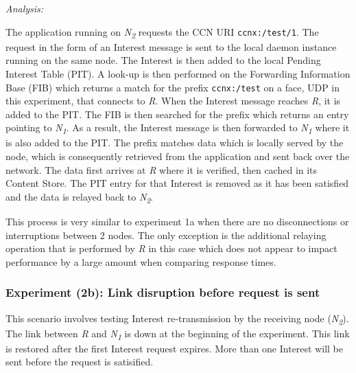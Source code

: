 \documentclass[a4paper,12pt]{report}      %
\begin{document}
\vspace*{1\baselineskip}\noindent\emph{Analysis:}

The application running on  \emph{N\textsubscript{2}} requests the CCN URI \verb!ccnx:/test/1!. The request in the form
of an Interest message is sent to the local daemon instance running on the same node. The Interest is
then added to the local Pending Interest Table (PIT). A look-up is then performed on the Forwarding
Information Base (FIB) which returns a match for the prefix \verb!ccnx:/test! on a face, UDP in this
experiment, that connects to  \emph{R}. When the Interest message reaches  \emph{R}, it is added to the PIT. 
The FIB is then searched for the prefix which returns an entry pointing to  \emph{N\textsubscript{1}}. As a result, the
Interest message is then forwarded to \emph{N\textsubscript{1}} where it is also added to the PIT. The prefix matches data
which is locally served by the node, which is consequently retrieved from the application and sent back
over the network. The data first arrives at \emph{R} where it is verified, then cached in its Content Store.
The PIT entry for that Interest is removed as it has been satisfied and the data is relayed back to  \emph{N\textsubscript{2}}.

This process is very similar to experiment 1a when there are no disconnections or interruptions
between 2 nodes. The only exception is the additional relaying operation that is performed by \emph{R} in
this case which does not appear to impact performance by a large amount when comparing response
times.

\subsubsection{Experiment (2b): Link disruption before request is sent}

This scenario involves testing Interest re-transmission by the receiving node (\emph{N\textsubscript{2}}). The link
between \emph{R} and \emph{N\textsubscript{1}} is down at the beginning of the experiment. This link is restored after
the first Interest request expires. More than one Interest will be sent before the request is satisified.
\end{document}
